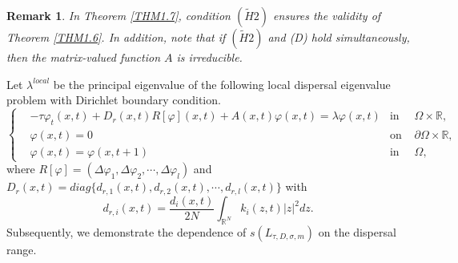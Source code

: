 \documentclass[11pt,reqno]{amsart}
\newtheorem{remark}[theorem]{Remark}
\numberwithin{equation}{section}
\begin{document}
\begin{remark}{\rm
In Theorem \ref{THM1.7}, condition ${ (\tilde{H}2) }$ ensures the validity of Theorem \ref{THM1.6}. In addition, note that if ${  (\tilde{H}2) }$ and (D) hold simultaneously, then the matrix-valued function $A$ is irreducible.
}
\end{remark}

Let $\lambda^{local}$ be the principal eigenvalue of the following local dispersal eigenvalue problem with Dirichlet boundary condition.
\begin{equation}\label{1-2}
\left\{
\begin{aligned}
& -\tau\varphi_{t}(x,t)+D_{r}(x,t)R[\varphi](x,t)+A(x,t)\varphi(x,t) = \lambda\varphi(x,t) &\text{in }& \Omega\times \mathbb{R},\\
&\varphi(x,t)=0  &\text{on }& \partial\Omega\times \mathbb{R},\\
&\varphi(x,t)=\varphi(x,t+1)  &\text{in }& \Omega,
\end{aligned}
\right.
\end{equation}
where $R[\varphi]=(\Delta \varphi_{1}, \Delta \varphi_{2}, \cdots , \Delta \varphi_{l})$
and
$D_{r}(x,t)=diag\{ d_{r,1}(x,t), d_{r,2}(x,t),\cdots,d_{r,l}(x,t) \}$ with
\begin{equation*}
d_{r,i}(x,t)=\frac{d_{i}(x,t)}{2N}\int_{\mathbb{R}^{N}}k_{i}(z,t)|z|^{2}dz.
\end{equation*}
Subsequently, we demonstrate the dependence of $s(L_{\tau,D,\sigma,m})$ on the dispersal range. 
\end{document}
